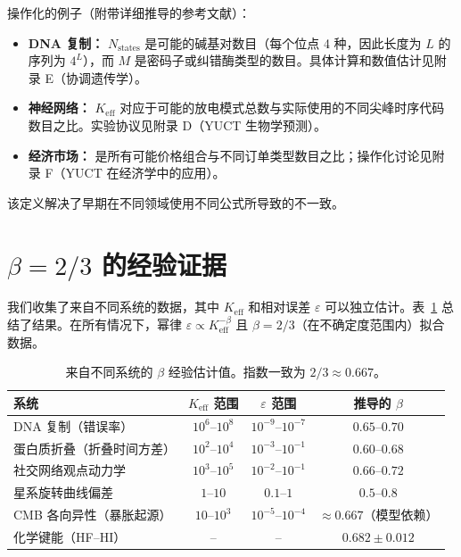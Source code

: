 \documentclass[12pt]{article}
\newcommand{\Keff}{K_{\mathrm{eff}}}
\newcommand{\eps}{\varepsilon}
\begin{document}
	操作化的例子（附带详细推导的参考文献）：
	\begin{itemize}
		\item \textbf{DNA 复制：} \(N_{\text{states}}\) 是可能的碱基对数目（每个位点 4 种，因此长度为 \(L\) 的序列为 \(4^L\)），而 \(M\) 是密码子或纠错酶类型的数目。具体计算和数值估计见附录 E（协调遗传学）。
		\item \textbf{神经网络：} \(\Keff\) 对应于可能的放电模式总数与实际使用的不同尖峰时序代码数目之比。实验协议见附录 D（YUCT 生物学预测）。
		\item \textbf{经济市场：} 是所有可能价格组合与不同订单类型数目之比；操作化讨论见附录 F（YUCT 在经济学中的应用）。
	\end{itemize}
	该定义解决了早期在不同领域使用不同公式所导致的不一致。
	
	\section{\(\beta = 2/3\) 的经验证据}
	\label{sec:evidence}
	
	我们收集了来自不同系统的数据，其中 \(\Keff\) 和相对误差 \(\eps\) 可以独立估计。表~\ref{tab:data} 总结了结果。在所有情况下，幂律 \(\eps \propto \Keff^{-\beta}\) 且 \(\beta = 2/3\)（在不确定度范围内）拟合数据。
	
	\begin{table}[htbp]
		\centering
		\caption{来自不同系统的 \(\beta\) 经验估计值。指数一致为 \(2/3 \approx 0.667\)。}
		\label{tab:data}
		\begin{tabular}{lccc}
			\toprule
			系统 & \(\Keff\) 范围 & \(\eps\) 范围 & 推导的 \(\beta\) \\
			\midrule
			DNA 复制（错误率） & \(10^6\)–\(10^8\) & \(10^{-9}\)–\(10^{-7}\) & \(0.65\)–\(0.70\) \\
			蛋白质折叠（折叠时间方差） & \(10^2\)–\(10^4\) & \(10^{-3}\)–\(10^{-1}\) & \(0.60\)–\(0.68\) \\
			社交网络观点动力学 & \(10^3\)–\(10^5\) & \(10^{-2}\)–\(10^{-1}\) & \(0.66\)–\(0.72\) \\
			星系旋转曲线偏差 & \(1\)–\(10\) & \(0.1\)–\(1\) & \(0.5\)–\(0.8\) \\
			CMB 各向异性（暴胀起源） & \(10\)–\(10^3\) & \(10^{-5}\)–\(10^{-4}\) & \(\approx 0.667\)（模型依赖） \\
			化学键能（HF–HI） & – & – & \(0.682 \pm 0.012\) \\
			\bottomrule
		\end{tabular}
	\end{table}
	
\end{document}
